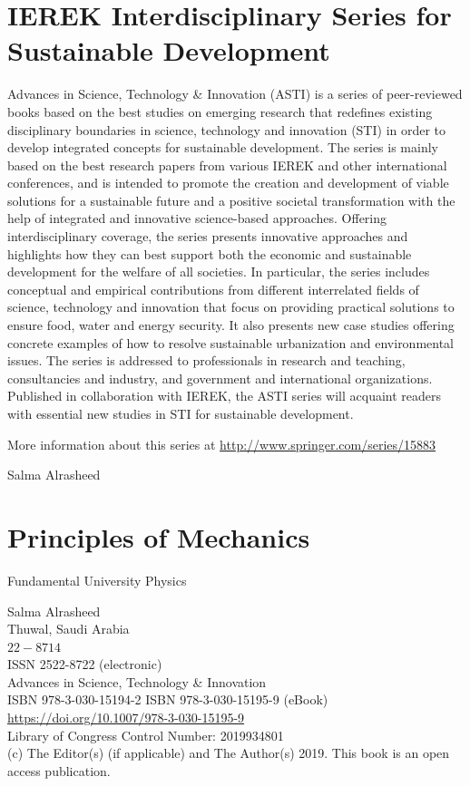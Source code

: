 \documentclass[10pt]{article}
\begin{document}
\section*{IEREK Interdisciplinary Series for Sustainable Development}
Advances in Science, Technology \& Innovation (ASTI) is a series of peer-reviewed books based on the best studies on emerging research that redefines existing disciplinary boundaries in science, technology and innovation (STI) in order to develop integrated concepts for sustainable development. The series is mainly based on the best research papers from various IEREK and other international conferences, and is intended to promote the creation and development of viable solutions for a sustainable future and a positive societal transformation with the help of integrated and innovative science-based approaches. Offering interdisciplinary coverage, the series presents innovative approaches and highlights how they can best support both the economic and sustainable development for the welfare of all societies. In particular, the series includes conceptual and empirical contributions from different interrelated fields of science, technology and innovation that focus on providing practical solutions to ensure food, water and energy security. It also presents new case studies offering concrete examples of how to resolve sustainable urbanization and environmental issues. The series is addressed to professionals in research and teaching, consultancies and industry, and government and international organizations. Published in collaboration with IEREK, the ASTI series will acquaint readers with essential new studies in STI for sustainable development.

More information about this series at \href{http://www.springer.com/series/15883}{http://www.springer.com/series/15883}

Salma Alrasheed

\section*{Principles of Mechanics}
Fundamental University Physics

Salma Alrasheed\\
Thuwal, Saudi Arabia\\
$22-8714$\\
ISSN 2522-8722 (electronic)\\
Advances in Science, Technology \& Innovation\\
ISBN 978-3-030-15194-2 ISBN 978-3-030-15195-9 (eBook)\\
\href{https://doi.org/10.1007/978-3-030-15195-9}{https://doi.org/10.1007/978-3-030-15195-9}\\
Library of Congress Control Number: 2019934801\\
(c) The Editor(s) (if applicable) and The Author(s) 2019. This book is an open access publication.
\end{document}
